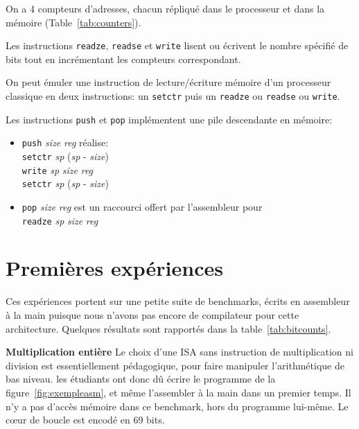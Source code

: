 \documentclass[architecture]{compas2018}
\begin{document}
On a 4 compteurs d'adresses, chacun  répliqué dans le processeur et dans la mémoire (Table~\ref{tab:counters}).


Les instructions \texttt{readze}, \texttt{readse} et \texttt{write} lisent ou écrivent le nombre spécifié de bits tout en incrémentant les compteurs correspondant.

On peut émuler une instruction de lecture/écriture mémoire d'un processeur classique en deux instructions: un \texttt{setctr} puis un \texttt{readze} ou \texttt{readse} ou \texttt{write}.

Les instructions \texttt{push} et \texttt{pop} implémentent une pile descendante en mémoire: 
\begin{itemize}
\item \texttt{push} \emph{size} \emph{reg} réalise: \\
   \texttt{setctr} \textit{sp} (\textit{sp} - \textit{size})\\ \texttt{write}  \textit{sp} \textit{size} \textit{reg} \\ \texttt{setctr} \textit{sp} (\textit{sp} - \textit{size})
\item \texttt{pop} \emph{size} \emph{reg} est un raccourci offert par l'assembleur pour \\\texttt{readze} \textit{sp} \emph{size} \emph{reg}\\
  
\end{itemize}

\fi

\section{Premières expériences}
Ces expériences portent sur une petite suite de benchmarks, écrits en assembleur à la main puisque nous n'avons pas encore de compilateur pour cette architecture.
Quelques résultats sont rapportés dans la table~\ref{tab:bitcounts}.

\textbf{Multiplication entière} Le choix d'une ISA sans instruction de multiplication ni division est essentiellement pédagogique, pour faire manipuler l'arithmétique de bas niveau.
les étudiants ont donc dû écrire le programme de la figure~\ref{fig:exempleasm}, et même l'assembler à la main dans un premier temps.
Il n'y a pas d'accès mémoire dans ce benchmark, hors du programme lui-même.
Le c\oe ur de boucle est encodé en 69 bits.
\end{document}
